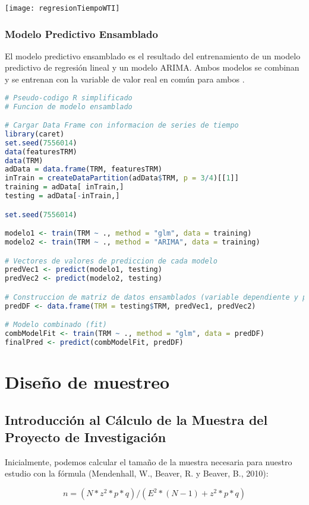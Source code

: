 \texttt{[image: regresionTiempoWTI]}\\

\subsubsection{Modelo Predictivo Ensamblado} 
El modelo predictivo ensamblado es el resultado del entrenamiento de un modelo predictivo de regresión lineal y un modelo ARIMA. Ambos modelos se combinan y se entrenan con la variable de valor real en común para ambos \cite{viswanathan}.

\begin{lstlisting}[language=R]
# Pseudo-codigo R simplificado
# Funcion de modelo ensamblado

# Cargar Data Frame con informacion de series de tiempo
library(caret)
set.seed(7556014)
data(featuresTRM)
data(TRM)
adData = data.frame(TRM, featuresTRM)
inTrain = createDataPartition(adData$TRM, p = 3/4)[[1]]
training = adData[ inTrain,]
testing = adData[-inTrain,]

set.seed(7556014)

modelo1 <- train(TRM ~ ., method = "glm", data = training)
modelo2 <- train(TRM ~ ., method = "ARIMA", data = training)

# Vectores de valores de prediccion de cada modelo
predVec1 <- predict(modelo1, testing)
predVec2 <- predict(modelo2, testing)

# Construccion de matriz de datos ensamblados (variable dependiente y predictor)
predDF <- data.frame(TRM = testing$TRM, predVec1, predVec2)

# Modelo combinado (fit)
combModelFit <- train(TRM ~ ., method = "glm", data = predDF)
finalPred <- predict(combModelFit, predDF) 
\end{lstlisting}

\section{Diseño de muestreo}

\subsection{Introducción al Cálculo de la Muestra del Proyecto de Investigación}
Inicialmente, podemos calcular el tamaño de la muestra necesaria para nuestro estudio con la fórmula (Mendenhall, W., Beaver, R. y Beaver, B., 2010):

\[ n =  (N* z^2*p*q)/(E^2*(N-1)+ z^2*p*q)\]

